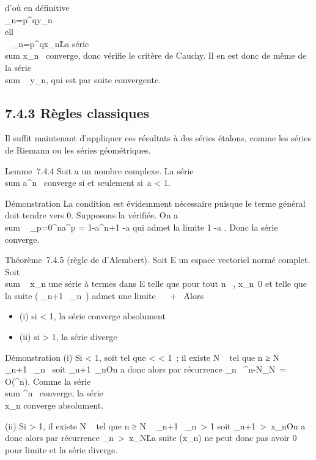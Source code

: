\documentclass[]{article}
\begin{document}
d'où en définitive \\\sum
 _n=p^qy_n  \over
\\ell\
\\
\sum ~
_n=p^qx_n\. La série
\\sum  x_n~
converge, donc vérifie le critère de Cauchy. Il en est donc de même de
la série \\sum ~
y_n, qui est par suite convergente.

\subsection{7.4.3 Règles classiques}

Il suffit maintenant d'appliquer ces résultats à des séries étalons,
comme les séries de Riemann ou les séries géométriques.

Lemme~7.4.4 Soit a un nombre complexe. La série
\\sum  a^n~
converge si et seulement si~a < 1.

Démonstration La condition est évidemment nécessaire puisque le terme
général doit tendre vers 0. Supposons la vérifiée. On a
\\sum ~
_p=0^na^p = 1-a^n+1
-a qui admet la limite  1 \over
1-a . Donc la série converge.

Théorème~7.4.5 (règle de d'Alembert). Soit E un espace vectoriel normé
complet. Soit \\sum ~
x_n une série à termes dans E telle que pour tout n \in {}~,
x_n\neq~0 et telle que la suite (
\x_n+1\
\over
\x_n\ )
admet une limite \ell \in {}~ \cup\ + \infty~\. Alors

\begin{itemize}
\itemsep1pt\parskip0pt
\item
  (i) si \ell < 1, la série converge absolument
\item
  (ii) si \ell > 1, la série diverge
\end{itemize}

Démonstration (i) Si \ell < 1, soit \rho tel que \ell < \rho
< 1~; il existe N \in {}~ tel que n ≥ N \rigtharrow~
\x_n+1\
\over
\x_n\ \leq \rho
soit \x_n+1\
\leq \rho\x_n\. On
a donc alors par récurrence
\x_n\ \leq
\rho^n-N\x_N\
= O(\rho^n). Comme la série
\\sum  \rho^n~
converge, la série \\\sum
 x_n converge absolument.

(ii) Si \ell > 1, il existe N \in {}~ tel que n ≥ N \rigtharrow~
\x_n+1\
\over
\x_n\
> 1 soit
\x_n+1\
>\
x_n\. On a donc alors par récurrence
\x_n\
>\
x_N\. La suite (x_n) ne peut
donc pas avoir 0 pour limite et la série diverge.
\end{document}
